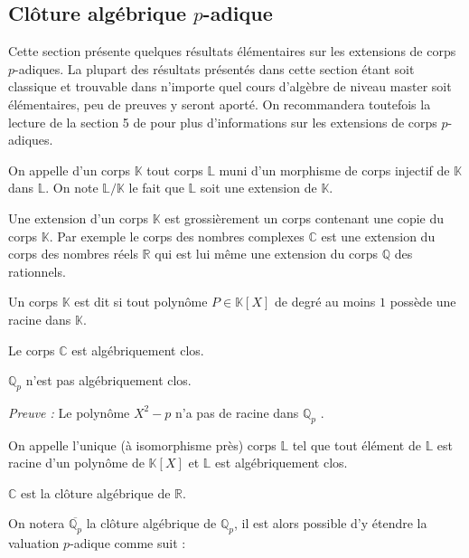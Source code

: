 \subsection{Clôture algébrique \texorpdfstring{$p$}{p}-adique } 
Cette section présente quelques résultats élémentaires sur les extensions de corps $p$-adiques. La plupart des résultats présentés dans cette section étant soit classique et trouvable dans n'importe quel cours d'algèbre de niveau master soit élémentaires, peu de preuves y seront aporté. On recommandera toutefois la lecture de la section 5 de \parencite{gouvea_p-adic_2003} pour plus d'informations sur les extensions de corps $p$-adiques. 

\begin{definition}
	On appelle  d'un corps $\mathbb{K}$ tout corps $\mathbb{L}$ muni d'un morphisme de corps injectif de $\mathbb{K}$ dans $\mathbb{L}$. On note $\mathbb{L}/\mathbb{K}$ le fait que $\mathbb{L}$ soit une extension de $\mathbb{K}.$
\end{definition}
Une extension d'un corps $\mathbb{K}$ est grossièrement un corps contenant une copie du corps $\mathbb{K}$. Par exemple le corps des nombres complexes $\mathbb{C}$ est une extension du corps des nombres réels $\mathbb{R}$ qui est lui même une extension du corps $\mathbb{Q}$ des rationnels.

\begin{definition}
	Un corps $\mathbb{K}$ est dit  si tout polynôme $P\in \mathbb{K}[X]$ de degré au moins $1$ possède une racine dans $\mathbb{K}$.
\end{definition}
\begin{ex}
	Le corps $\mathbb{C}$ est algébriquement clos.
\end{ex}
\begin{proposition}
	$\mathbb{Q}_{p} $ n'est pas algébriquement clos.
\end{proposition}
\textit{Preuve :} Le polynôme $X^2 - p$ n'a pas de racine dans $\mathbb{Q}_{p}$ \hfill \qedsymbol.

\begin{definition}
	On appelle  l'unique (à isomorphisme près) corps $\mathbb{L}$ tel que tout élément de $\mathbb{L}$ est racine d'un polynôme de $\mathbb{K}[X]$ et $\mathbb{L}$ est algébriquement clos.
\end{definition}
\begin{ex}
	$\mathbb{C}$ est la clôture algébrique de $\mathbb{R}$.
\end{ex}
On notera $\overline{\mathbb{Q}_{p} }$ la clôture algébrique de $\mathbb{Q}_{p}$, il est alors possible d'y étendre la valuation $p$-adique comme suit :

